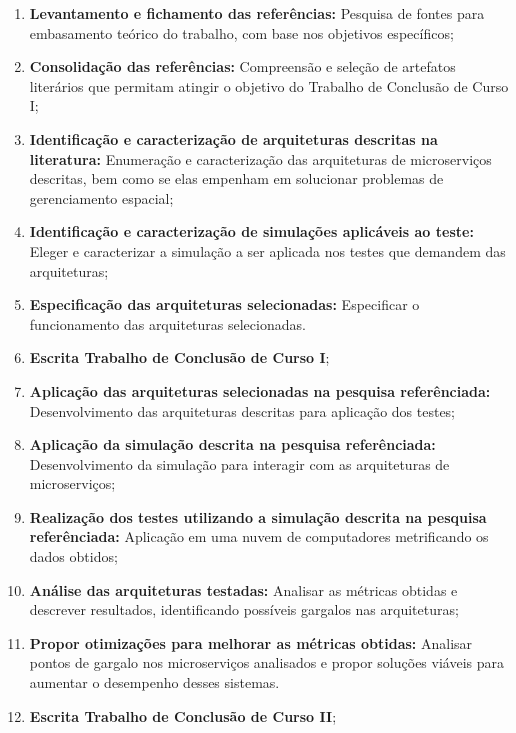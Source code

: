 \begin{enumerate}
  \item \textbf{Levantamento e fichamento das referências:} Pesquisa de fontes para embasamento teórico do trabalho, com base nos objetivos específicos;

  \item \textbf{Consolidação das referências:} Compreensão e seleção de artefatos literários que permitam atingir o objetivo do Trabalho de Conclusão de Curso I;

  \item \textbf{Identificação e caracterização de arquiteturas descritas na literatura:} Enumeração e caracterização das arquiteturas de microserviços descritas, bem como se elas empenham em solucionar problemas de gerenciamento espacial;

  \item \textbf{Identificação e caracterização de simulações aplicáveis ao teste:} Eleger e caracterizar a simulação a ser aplicada nos testes que demandem das arquiteturas;

  \item \textbf{Especificação das arquiteturas selecionadas:} Especificar o funcionamento das arquiteturas selecionadas.

  \item \textbf{Escrita Trabalho de Conclusão de Curso I};

  \item \textbf{Aplicação das arquiteturas selecionadas na pesquisa referênciada:} Desenvolvimento das arquiteturas descritas para aplicação dos testes;

  \item \textbf{Aplicação da simulação descrita na pesquisa referênciada:} Desenvolvimento da simulação para interagir com as arquiteturas de microserviços;

  \item \textbf{Realização dos testes utilizando a simulação descrita na pesquisa referênciada:} Aplicação em uma nuvem de computadores metrificando os dados obtidos;

  \item \textbf{Análise das arquiteturas testadas:} Analisar as métricas obtidas e descrever resultados, identificando possíveis gargalos nas arquiteturas;

  \item \textbf{Propor otimizações para melhorar as métricas obtidas:} Analisar pontos de gargalo nos microserviços analisados e propor soluções viáveis para aumentar o desempenho desses sistemas.

  \item \textbf{Escrita Trabalho de Conclusão de Curso II};
\end{enumerate}

